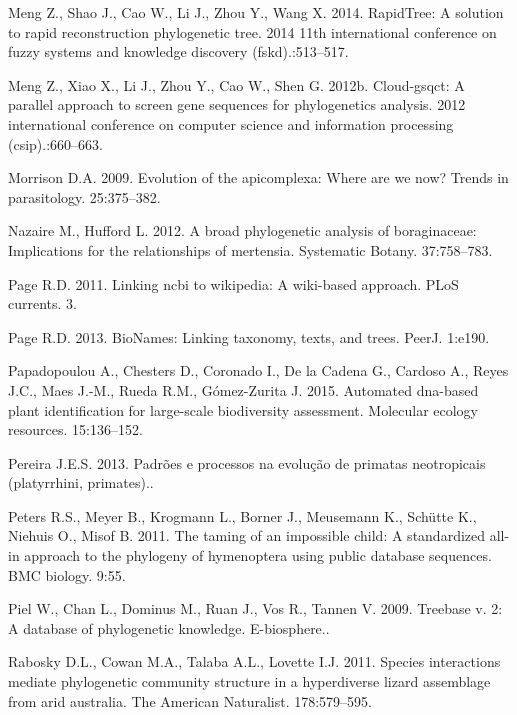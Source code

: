 \documentclass[]{article}
\begin{document}
\leavevmode\hypertarget{ref-meng2014rapidtree}{}%
Meng Z., Shao J., Cao W., Li J., Zhou Y., Wang X. 2014. RapidTree: A solution to rapid reconstruction phylogenetic tree. 2014 11th international conference on fuzzy systems and knowledge discovery (fskd).:513--517.

\leavevmode\hypertarget{ref-meng2012cloud}{}%
Meng Z., Xiao X., Li J., Zhou Y., Cao W., Shen G. 2012b. Cloud-gsqct: A parallel approach to screen gene sequences for phylogenetics analysis. 2012 international conference on computer science and information processing (csip).:660--663.

\leavevmode\hypertarget{ref-morrison2009apicomplexa}{}%
Morrison D.A. 2009. Evolution of the apicomplexa: Where are we now? Trends in parasitology. 25:375--382.

\leavevmode\hypertarget{ref-nazaire2012broad}{}%
Nazaire M., Hufford L. 2012. A broad phylogenetic analysis of boraginaceae: Implications for the relationships of mertensia. Systematic Botany. 37:758--783.

\leavevmode\hypertarget{ref-page2011linking}{}%
Page R.D. 2011. Linking ncbi to wikipedia: A wiki-based approach. PLoS currents. 3.

\leavevmode\hypertarget{ref-page2013bionames}{}%
Page R.D. 2013. BioNames: Linking taxonomy, texts, and trees. PeerJ. 1:e190.

\leavevmode\hypertarget{ref-papadopoulou2015automated}{}%
Papadopoulou A., Chesters D., Coronado I., De la Cadena G., Cardoso A., Reyes J.C., Maes J.-M., Rueda R.M., Gómez-Zurita J. 2015. Automated dna-based plant identification for large-scale biodiversity assessment. Molecular ecology resources. 15:136--152.

\leavevmode\hypertarget{ref-pereira2013padroes}{}%
Pereira J.E.S. 2013. Padrões e processos na evolução de primatas neotropicais (platyrrhini, primates)..

\leavevmode\hypertarget{ref-peters2011taming}{}%
Peters R.S., Meyer B., Krogmann L., Borner J., Meusemann K., Schütte K., Niehuis O., Misof B. 2011. The taming of an impossible child: A standardized all-in approach to the phylogeny of hymenoptera using public database sequences. BMC biology. 9:55.

\leavevmode\hypertarget{ref-piel2009treebase}{}%
Piel W., Chan L., Dominus M., Ruan J., Vos R., Tannen V. 2009. Treebase v. 2: A database of phylogenetic knowledge. E-biosphere..

\leavevmode\hypertarget{ref-rabosky2011species}{}%
Rabosky D.L., Cowan M.A., Talaba A.L., Lovette I.J. 2011. Species interactions mediate phylogenetic community structure in a hyperdiverse lizard assemblage from arid australia. The American Naturalist. 178:579--595.
\end{document}
